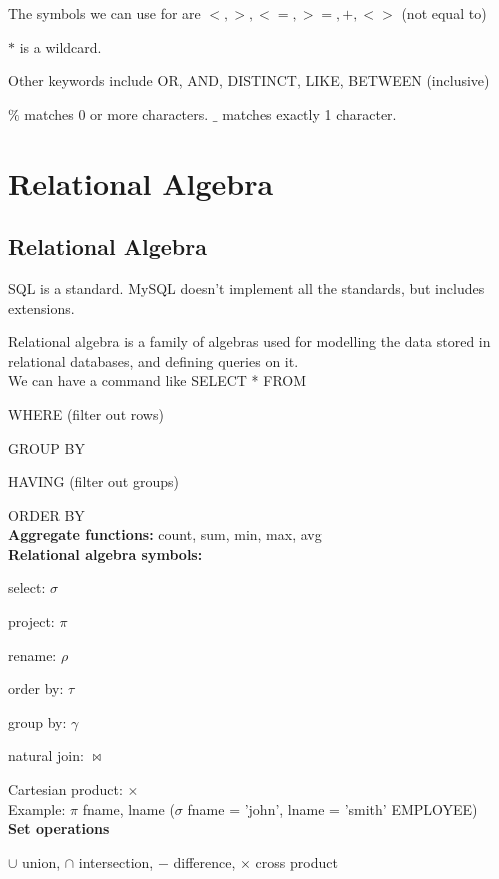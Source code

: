 \documentclass[english,openany]{book}
\begin{document}
    The symbols we can use for are $<, >, <=, >=, +, <>$ (not equal to)

    $*$ is a wildcard.

    Other keywords include OR, AND, DISTINCT, LIKE, BETWEEN (inclusive)

    $\%$ matches 0 or more characters. $\_$ matches exactly 1 character.

    \chapter{Relational Algebra}

    \section{Relational Algebra}

    SQL is a standard. MySQL doesn't implement all the standards, but includes extensions.

    Relational algebra is a family of algebras used for modelling the data stored in relational databases, and defining queries on it.\\

    We can have a command like SELECT * FROM

    WHERE (filter out rows)

    GROUP BY

    HAVING (filter out groups)

    ORDER BY\\

    \textbf{Aggregate functions:} count, sum, min, max, avg\\

    \textbf{Relational algebra symbols:}

    select: $\sigma$

    project: $\pi$

    rename: $\rho$

    order by: $\tau$

    group by: $\gamma$

    natural join: $\bowtie$

    Cartesian product: $\times$\\

    Example: $\pi$ fname, lname ($\sigma$ fname = 'john', lname = 'smith' EMPLOYEE)\\

    \textbf{Set operations}

    $\cup$ union, $\cap$ intersection, $-$ difference, $\times$ cross product
\end{document}
